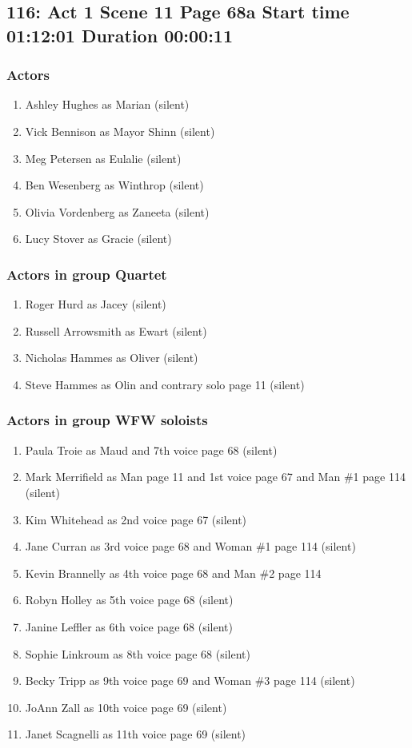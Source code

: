 \subsection{116: Act 1 Scene 11 Page 68a Start time 01:12:01 Duration 00:00:11}

\subsubsection{Actors}
\begin{enumerate}
\item Ashley Hughes as Marian (silent)
\item Vick Bennison as Mayor Shinn (silent)
\item Meg Petersen as Eulalie (silent)
\item Ben Wesenberg as Winthrop (silent)
\item Olivia Vordenberg as Zaneeta (silent)
\item Lucy Stover as Gracie (silent)
\end{enumerate}
\subsubsection{Actors in group Quartet}
\begin{enumerate}
\item Roger Hurd as Jacey (silent)
\item Russell Arrowsmith as Ewart (silent)
\item Nicholas Hammes as Oliver (silent)
\item Steve Hammes as Olin and contrary solo page 11 (silent)
\end{enumerate}
\subsubsection{Actors in group WFW soloists}
\begin{enumerate}
\item Paula Troie as Maud and 7th voice page 68 (silent)
\item Mark Merrifield as Man page 11 and 1st voice page 67 and Man \#1 page 114 (silent)
\item Kim Whitehead as 2nd voice page 67 (silent)
\item Jane Curran as 3rd voice page 68 and Woman \#1 page 114 (silent)
\item Kevin Brannelly as 4th voice page 68 and Man \#2 page 114
\item Robyn Holley as 5th voice page 68 (silent)
\item Janine Leffler as 6th voice page 68 (silent)
\item Sophie Linkroum as 8th voice page 68 (silent)
\item Becky Tripp as 9th voice page 69 and Woman \#3 page 114 (silent)
\item JoAnn Zall as 10th voice page 69 (silent)
\item Janet Scagnelli as 11th voice page 69 (silent)
\end{enumerate}


